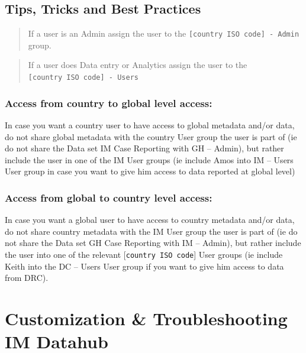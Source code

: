 \documentclass[]{book}
\begin{document}
\hypertarget{tips-tricks-and-best-practices}{%
\section{Tips, Tricks and Best Practices}\label{tips-tricks-and-best-practices}}

\begin{quote}
If a user is an Admin assign the user to the \texttt{{[}country\ ISO\ code{]}\ -\ Admin} group.
\end{quote}

\begin{quote}
If a user does Data entry or Analytics assign the user to the \texttt{{[}country\ ISO\ code{]}\ -\ Users}
\end{quote}

\hypertarget{access-from-country-to-global-level-access}{%
\subsection{Access from country to global level access:}\label{access-from-country-to-global-level-access}}

In case you want a country user to have access to global metadata and/or data, do not share global metadata with the country User group the user is part of (ie do not share the Data set IM Case Reporting with GH -- Admin), but rather include the user in one of the IM User groups (ie include Amos into IM -- Users User group in case you want to give him access to data reported at global level)

\hypertarget{access-from-global-to-country-level-access}{%
\subsection{Access from global to country level access:}\label{access-from-global-to-country-level-access}}

In case you want a global user to have access to country metadata and/or data, do not share country metadata with the IM User group the user is part of (ie do not share the Data set GH Case Reporting with IM -- Admin), but rather include the user into one of the relevant {[}\texttt{country\ ISO\ code}{]} User groups (ie include Keith into the DC -- Users User group if you want to give him access to data from DRC).

\hypertarget{custom}{%
\chapter{Customization \& Troubleshooting IM Datahub}\label{custom}}
\end{document}
